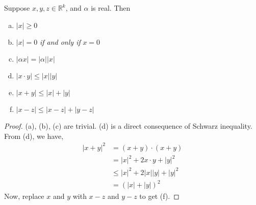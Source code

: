\begin{thm}
	Suppose $x, y, z \in \mathbb{R}^k$, and $\alpha$ is real. Then
	\begin{enumerate}[a)]
		\item $|x| \geq 0$
		\item $|x| = 0$ {\it if and only if } $x = 0$
		\item $|\alpha x| = |\alpha| |x|$
		\item $|x \cdot y| \leq |x||y|$
		\item $|x+y| \leq |x| + |y|$
		\item $|x-z| \leq |x-z| + |y-z|$
	\end{enumerate}

	\begin{proof}
		(a), (b), (c) are trivial. (d) is a direct consequence of Schwarz inequality.
		From (d), we have,
		\begin{align*}
			|x+y|^2 & = (x+y) \cdot (x+y) \\
				& = |x|^2 + 2 x \cdot y + |y|^2 \\
				& \leq |x|^2 + 2|x||y| + |y|^2 \\
				& = (|x| + |y|)^2
		\end{align*}
		Now, replace $x$ and $y$ with $x-z$ and $y-z$ to get (f).
	\end{proof}

\end{thm}
